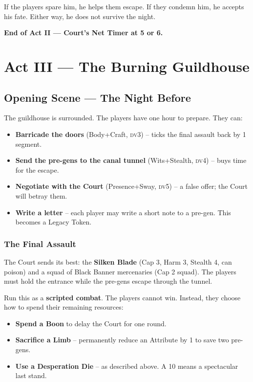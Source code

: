 \documentclass[10pt,twoside]{book}
\newcommand{\dv}{\textsc{dv}}
\begin{document}
If the players spare him, he helps them escape. If they condemn him, he accepts his fate. Either way, he does not survive the night.

\textbf{End of Act II --- Court's Net Timer at 5 or 6.}

\chapter{Act III --- The Burning Guildhouse}

\section{Opening Scene --- The Night Before}

The guildhouse is surrounded. The players have one hour to prepare. They can:

\begin{itemize}
\item \textbf{Barricade the doors} (Body+Craft, \dv 3) -- ticks the final assault back by 1 segment.
\item \textbf{Send the pre-gens to the canal tunnel} (Wits+Stealth, \dv 4) -- buys time for the escape.
\item \textbf{Negotiate with the Court} (Presence+Sway, \dv 5) -- a false offer; the Court will betray them.
\item \textbf{Write a letter} -- each player may write a short note to a pre-gen. This becomes a Legacy Token.
\end{itemize}

\subsection{The Final Assault}

The Court sends its best: the \textbf{Silken Blade} (Cap 3, Harm 3, Stealth 4, can poison) and a squad of Black Banner mercenaries (Cap 2 squad). The players must hold the entrance while the pre-gens escape through the tunnel.

Run this as a \textbf{scripted combat}. The players cannot win. Instead, they choose how to spend their remaining resources:

\begin{itemize}
\item \textbf{Spend a Boon} to delay the Court for one round.
\item \textbf{Sacrifice a Limb} -- permanently reduce an Attribute by 1 to save two pre-gens.
\item \textbf{Use a Desperation Die} -- as described above. A 10 means a spectacular last stand.
\end{itemize}
\end{document}
